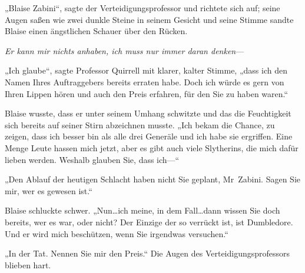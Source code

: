„Blaise Zabini“, sagte der Verteidigungsprofessor und richtete sich auf; seine Augen saßen wie zwei dunkle Steine in seinem Gesicht und seine Stimme sandte Blaise einen ängstlichen Schauer über den Rücken.

\emph{Er kann mir nichts anhaben, ich muss nur immer daran denken}—

„Ich glaube“, sagte Professor Quirrell mit klarer, kalter Stimme, „dass ich den Namen Ihres Auftraggebers bereits erraten habe. Doch ich würde es gern von Ihren Lippen hören und auch den Preis erfahren, für den Sie zu haben waren.“

Blaise wusste, dass er unter seinem Umhang schwitzte und das die Feuchtigkeit sich bereits auf seiner Stirn abzeichnen musste. „Ich bekam die Chance, zu zeigen, dass ich besser bin als alle drei Generäle und ich habe sie ergriffen. Eine Menge Leute hassen mich jetzt, aber es gibt auch viele Slytherins, die mich dafür lieben werden. Weshalb glauben Sie, dass ich—“

„Den Ablauf der heutigen Schlacht haben nicht Sie geplant, Mr~Zabini. Sagen Sie mir, wer es gewesen ist.“

Blaise schluckte schwer. „Nun…ich meine, in dem Fall…dann wissen Sie doch bereits, wer es war, oder nicht? Der Einzige der so verrückt ist, ist Dumbledore. Und er wird mich beschützen, wenn Sie irgendwas versuchen.“

„In der Tat. Nennen Sie mir den Preis.“ Die Augen des Verteidigungsprofessors blieben hart.

